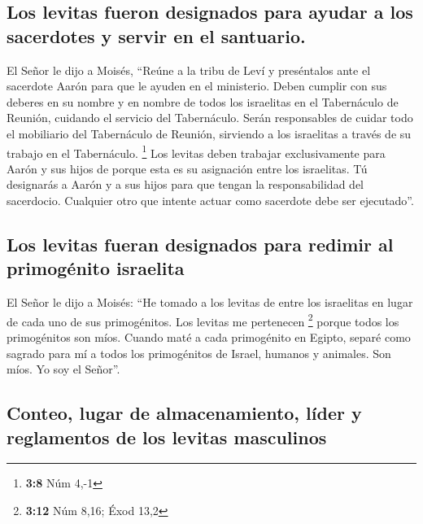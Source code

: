 \hypertarget{los-levitas-fueron-designados-para-ayudar-a-los-sacerdotes-y-servir-en-el-santuario.}{%
\subsection{Los levitas fueron designados para ayudar a los sacerdotes y
servir en el
santuario.}\label{los-levitas-fueron-designados-para-ayudar-a-los-sacerdotes-y-servir-en-el-santuario.}}

 El Señor le dijo a Moisés,  ``Reúne a la
tribu de Leví y preséntalos ante el sacerdote Aarón para que le ayuden
en el ministerio.  Deben cumplir con sus deberes en su
nombre y en nombre de todos los israelitas en el Tabernáculo de Reunión,
cuidando el servicio del Tabernáculo.  Serán responsables
de cuidar todo el mobiliario del Tabernáculo de Reunión, sirviendo a los
israelitas a través de su trabajo en el Tabernáculo. \footnote{\textbf{3:8}
  Núm 4,-1}  Los levitas deben trabajar exclusivamente
para Aarón y sus hijos de porque esta es su asignación entre los
israelitas.  Tú designarás a Aarón y a sus hijos para que
tengan la responsabilidad del sacerdocio. Cualquier otro que intente
actuar como sacerdote debe ser ejecutado''.

\hypertarget{los-levitas-fueran-designados-para-redimir-al-primoguxe9nito-israelita}{%
\subsection{Los levitas fueran designados para redimir al primogénito
israelita}\label{los-levitas-fueran-designados-para-redimir-al-primoguxe9nito-israelita}}

 El Señor le dijo a Moisés:  ``He tomado a
los levitas de entre los israelitas en lugar de cada uno de sus
primogénitos. Los levitas me pertenecen \footnote{\textbf{3:12} Núm
  8,16; Éxod 13,2}  porque todos los primogénitos son
míos. Cuando maté a cada primogénito en Egipto, separé como sagrado para
mí a todos los primogénitos de Israel, humanos y animales. Son míos. Yo
soy el Señor''.

\hypertarget{conteo-lugar-de-almacenamiento-luxedder-y-reglamentos-de-los-levitas-masculinos}{%
\subsection{Conteo, lugar de almacenamiento, líder y reglamentos de los
levitas
masculinos}\label{conteo-lugar-de-almacenamiento-luxedder-y-reglamentos-de-los-levitas-masculinos}}

